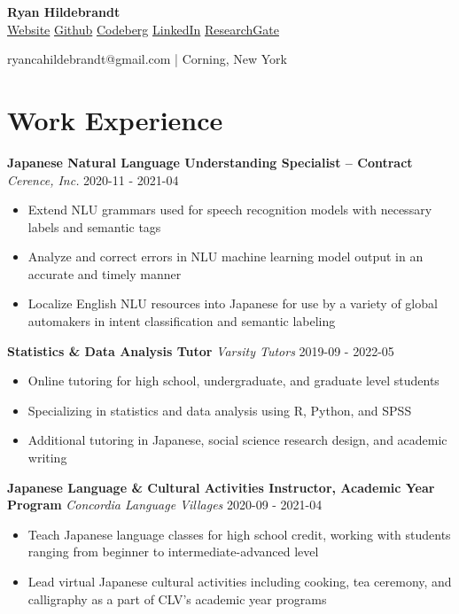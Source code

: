 \documentclass[a4paper,9pt]{extarticle}
\begin{document}
\begin{center}\textbf{\Large  Ryan Hildebrandt}\\[2pt]

\href{https://rcah.xyz}{Website} \href{https://github.com/ryancahildebrandt}{Github} \href{https://codeberg.org/ryancahildebrandt}{Codeberg} \href{https://linkedin.com/in/rcah}{LinkedIn} \href{https://researchgate.net/profile/Ryan-Hildebrandt}{ResearchGate} 

ryancahildebrandt@gmail.com | Corning, New York\end{center}


\section*{Work Experience}

\noindent
\textbf{Japanese Natural Language Understanding Specialist -- Contract}
\noindent
\textit{Cerence, Inc.} \hfill 2020-11 - 2021-04
\begin{itemize}

\item Extend NLU grammars used for speech recognition models with necessary labels and semantic tags
\item Analyze and correct errors in NLU machine learning model output in an accurate and timely manner
\item Localize English NLU resources into Japanese for use by a variety of global automakers in intent classification and semantic labeling
\end{itemize}

\noindent
\textbf{Statistics \& Data Analysis Tutor}
\noindent
\textit{Varsity Tutors} \hfill 2019-09 - 2022-05
\begin{itemize}

\item Online tutoring for high school, undergraduate, and graduate level students
\item Specializing in statistics and data analysis using R, Python, and SPSS
\item Additional tutoring in Japanese, social science research design, and academic writing
\end{itemize}

\noindent
\textbf{Japanese Language \& Cultural Activities Instructor, Academic Year Program}
\noindent
\textit{Concordia Language Villages} \hfill 2020-09 - 2021-04
\begin{itemize}

\item Teach Japanese language classes for high school credit, working with students ranging from beginner to intermediate-advanced level
\item Lead virtual Japanese cultural activities including cooking, tea ceremony, and calligraphy as a part of CLV's academic year programs
\end{itemize}
\end{document}
